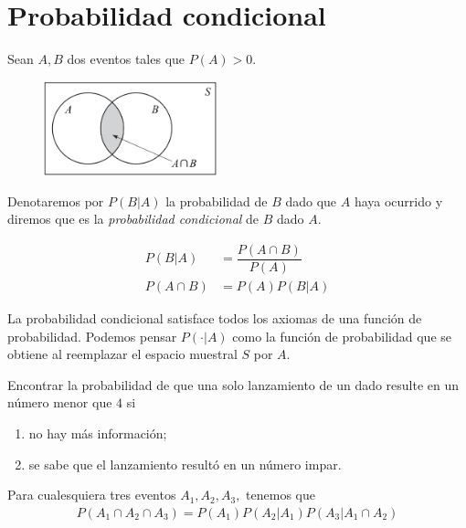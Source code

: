  \section{Probabilidad condicional}
{}
Sean $A,B$ dos eventos tales que $P(A)>0.$
\begin{figure}
	\centering
	\includegraphics[width=5cm,keepaspectratio=true]{./pe/pands0103.png}
	\label{pands0103}
\end{figure}

Denotaremos por $P(B|A)$
la probabilidad de $B$ dado que $A$ haya ocurrido y diremos que es la \emph{probabilidad condicional} de $B$ dado $A.$


\begin{definicion}
	\begin{align}
		P(B|A)&=\dfrac{P(A\cap B)}{P(A)} \\
		P(A\cap B) &= P(A)P(B|A)
	\end{align}
\end{definicion}


{}
\begin{observacion}
	La probabilidad condicional satisface todos los axiomas de una función de probabilidad.  Podemos pensar $P(\cdot|A)$ como la función de probabilidad que se obtiene al reemplazar el espacio muestral $S$ por $A.$
\end{observacion}


{}
\begin{ejemplo}
	\label{exmp:1.13}
	Encontrar la probabilidad de que una solo lanzamiento de un dado resulte en un número menor que $4$ si
	\begin{enumerate}
		\item no hay más información; 
		\item se sabe que el lanzamiento resultó en un número impar.
	\end{enumerate}
	
\end{ejemplo}


{}
\begin{teorema}
	\label{thm:1.9}
	Para cualesquiera tres eventos $A_{1},A_{2},A_{3},$ tenemos que
	\begin{align}
		\label{1.19}
		P(A_{1} \cap A_{2} \cap A_{3})=P(A_{1})P(A_{2}|A_{1})P(A_{3}|A_{1} \cap A_{2})
	\end{align}
\end{teorema}


